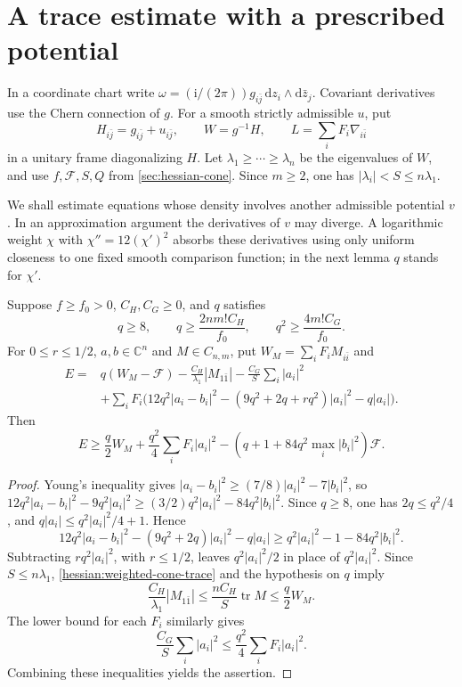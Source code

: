 \section{A trace estimate with a prescribed potential}
\label{sec:hessian-trace}

In a coordinate chart write
$\omega=(\mathrm i/(2\pi))g_{i\bar j}\,\mathrm dz_i\wedge\mathrm d\bar z_j$.
Covariant derivatives use the Chern connection of $g$. For a smooth
strictly admissible $u$, put
\[
 H_{i\bar j}=g_{i\bar j}+u_{i\bar j},\qquad W=g^{-1}H,
 \qquad L=\sum_iF_i\nabla_{i\bar i}
\]
in a unitary frame diagonalizing $H$. Let $\lambda_1\geq\cdots\geq\lambda_n$ be
the eigenvalues of $W$, and use $f,\mathcal F,S,Q$ from
\cref{sec:hessian-cone}. Since $m\geq2$, one has
$|\lambda_i|<S\leq n\lambda_1$.

We shall estimate equations whose density involves another admissible
potential $v$. In an approximation argument the derivatives of $v$ may
diverge. A logarithmic weight $\chi$ with $\chi''=12(\chi')^2$ absorbs
these derivatives using only uniform closeness to one fixed smooth
comparison function; in the next lemma $q$ stands for $\chi'$.

\begin{lemma}\label{hessian:fixed-comparison-absorption}\label{hessian:hessian-gradient-absorption}
Suppose $f\geq f_0>0$, $C_H,C_G\geq0$, and $q$ satisfies
\[
 q\geq8,\qquad q\geq\frac{2nm!C_H}{f_0},\qquad
 q^2\geq\frac{4m!C_G}{f_0}.
\]
For $0\leq r\leq1/2$, $a,b\in\mathbb C^n$ and $M\in C_{n,m}$, put $W_M=\sum_iF_iM_{i\bar i}$ and
\begin{align*}
 E={}&q(W_M-\mathcal F)-\frac{C_H}{\lambda_1}|M_{1\bar1}|
             -\frac{C_G}{S}\sum_i|a_i|^2\\
 &+\sum_iF_i\bigl(12q^2|a_i-b_i|^2
             -(9q^2+2q+rq^2)|a_i|^2-q|a_i|\bigr).
\end{align*}
Then
\[
 E\geq\frac q2W_M+\frac{q^2}{4}\sum_iF_i|a_i|^2
       -(q+1+84q^2\max_i|b_i|^2)\mathcal F.
\]
\end{lemma}
\begin{proof}
Young's inequality gives $|a_i-b_i|^2\geq(7/8)|a_i|^2-7|b_i|^2$, so $12q^2|a_i-b_i|^2-9q^2|a_i|^2\geq(3/2)q^2|a_i|^2-84q^2|b_i|^2$. Since $q\geq8$, one has $2q\leq q^2/4$, and $q|a_i|\leq q^2|a_i|^2/4+1$. Hence
\[
 12q^2|a_i-b_i|^2-(9q^2+2q)|a_i|^2-q|a_i|
 \geq q^2|a_i|^2-1-84q^2|b_i|^2.
\]
Subtracting $rq^2|a_i|^2$, with $r\leq1/2$, leaves $q^2|a_i|^2/2$ in place of $q^2|a_i|^2$. Since $S\leq n\lambda_1$, \cref{hessian:weighted-cone-trace} and the hypothesis on $q$ imply
\[
 \frac{C_H}{\lambda_1}|M_{1\bar1}|
 \leq\frac{nC_H}{S}\operatorname{tr}M\leq\frac q2 W_M.
\]
The lower bound for each $F_i$ similarly gives
\[
 \frac{C_G}{S}\sum_i|a_i|^2
             \leq\frac{q^2}{4}\sum_iF_i|a_i|^2.
\]
Combining these inequalities yields the assertion.
\end{proof}

